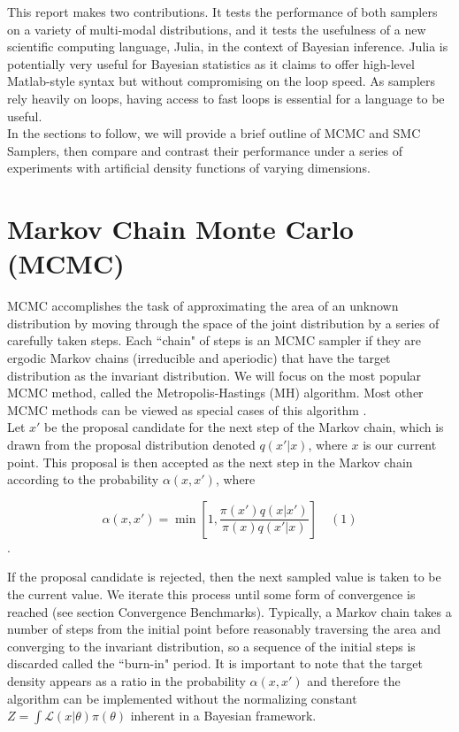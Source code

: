 \documentclass[12pt]{elsarticle}
\begin{document}
This report makes two contributions. It tests the performance of both samplers on a variety of multi-modal distributions, and it tests the usefulness of a new scientific computing language, Julia, in the context of Bayesian inference. Julia is potentially very useful for Bayesian statistics as it claims to offer high-level Matlab-style syntax but without compromising on the loop speed. As samplers rely heavily on loops, having access to fast loops is essential for a language to be useful.\\

In the sections to follow, we will provide a brief outline of MCMC and SMC Samplers, then compare and contrast their performance under a series of experiments with artificial density functions of varying dimensions.

\section*{Markov Chain Monte Carlo (MCMC)}
MCMC accomplishes the task of approximating the area of an unknown distribution by moving through the space of the joint distribution by a series of carefully taken steps. Each ``chain" of steps is an MCMC sampler if they are ergodic Markov chains (irreducible and aperiodic) that have the target distribution as the invariant distribution.  We will focus on the most popular MCMC method, called the Metropolis-Hastings (MH) algorithm. Most other MCMC methods can be viewed as special cases of this algorithm \cite{Andrieu2003}. \\

Let $x'$ be the proposal candidate for the next step of the Markov chain, which is drawn from the proposal distribution denoted $q(x'|x)$, where $x$ is our current point. This proposal is then accepted as the next step in the Markov chain according to the probability $\alpha(x,x')$, where 

\[
\alpha(x,x') = \min{\left[1, \frac{\pi(x') q(x|x')}{\pi(x)q(x'|x)}\right]} \quad (1)
\].

If the proposal candidate is rejected, then the next sampled value is taken to be the current value. We iterate this process until some form of convergence is reached (see section Convergence Benchmarks). Typically, a Markov chain takes a number of steps from the initial point before reasonably traversing the area and converging to the invariant distribution, so a sequence of the initial steps is discarded called the ``burn-in" period. It is important to note that the target density appears as a ratio in the probability $ \alpha(x,x')$ and therefore the algorithm can be implemented without the normalizing constant $Z = \int \mathcal{L}(x|\theta)\pi(\theta)$ inherent in a Bayesian framework.
\end{document}
